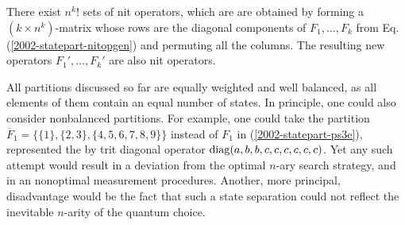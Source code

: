 There exist $n^k!$  sets of nit operators,
which are
are obtained by forming a $(k \times n^k)$-matrix
whose rows are the diagonal components of $F_1,\ldots,F_k$  from Eq.
(\ref{2002-statepart-nitopgen})
and permuting all the columns.
The resulting new operators $F_1',\ldots,F_k'$ are also nit operators.

All partitions discussed so far are equally weighted and well balanced,
as all elements of them contain an equal number of states.
In principle, one could also consider nonbalanced partitions.
For example, one could take the partition
$\overline{F}_1=\{\{1\},\{2,3\},\{4,5,6,7,8,9\}\}$
instead of $F_1$ in (\ref{2002-statepart-ps3e}),
represented the by trit diagonal operator
${\rm diag} (a,b,b,c,c,c,c,c,c)$.
Yet any such attempt would result
in a deviation from the optimal $n$-ary search strategy, and
in an nonoptimal measurement procedures.
Another, more principal, disadvantage would be the fact that such a state separation
could not reflect the inevitable $n$-arity of the quantum choice.




%


